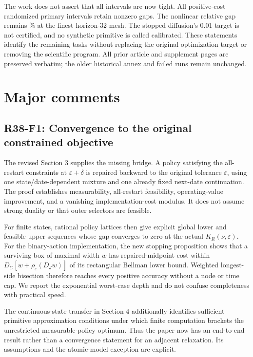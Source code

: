 The work does not assert that all intervals are now tight. All \PrimaryPositive{} positive-cost randomized primary intervals retain nonzero gaps. The nonlinear relative gap remains \NonlinearFineRelative\% at the finest horizon-32 mesh. The stopped diffusion's 0.01 target is not certified, and no synthetic primitive is called calibrated. These statements identify the remaining tasks without replacing the original optimization target or removing the scientific program. All prior article and supplement pages are preserved verbatim; the older historical annex and failed runs remain unchanged.

\section{Major comments}
\subsection{R38-F1: Convergence to the original constrained objective}
The revised Section 3 supplies the missing bridge. A policy satisfying the all-restart constraints at $\varepsilon+\delta$ is repaired backward to the original tolerance $\varepsilon$, using one state/date-dependent mixture and one already fixed next-date continuation. The proof establishes measurability, all-restart feasibility, operating-value improvement, and a vanishing implementation-cost modulus. It does not assume strong duality or that outer selectors are feasible.

For finite states, rational policy lattices then give explicit global lower and feasible upper sequences whose gap converges to zero at the actual $K_R(\nu,\varepsilon)$. For the binary-action implementation, the new stopping proposition shows that a surviving box of maximal width $w$ has repaired-midpoint cost within $D_C[w+\rho_\varepsilon(D_Jw)]$ of its rectangular Bellman lower bound. Weighted longest-side bisection therefore reaches every positive accuracy without a node or time cap. We report the exponential worst-case depth and do not confuse completeness with practical speed.

The continuous-state transfer in Section 4 additionally identifies sufficient primitive approximation conditions under which finite computation brackets the unrestricted measurable-policy optimum. Thus the paper now has an end-to-end result rather than a convergence statement for an adjacent relaxation. Its assumptions and the atomic-model exception are explicit.

